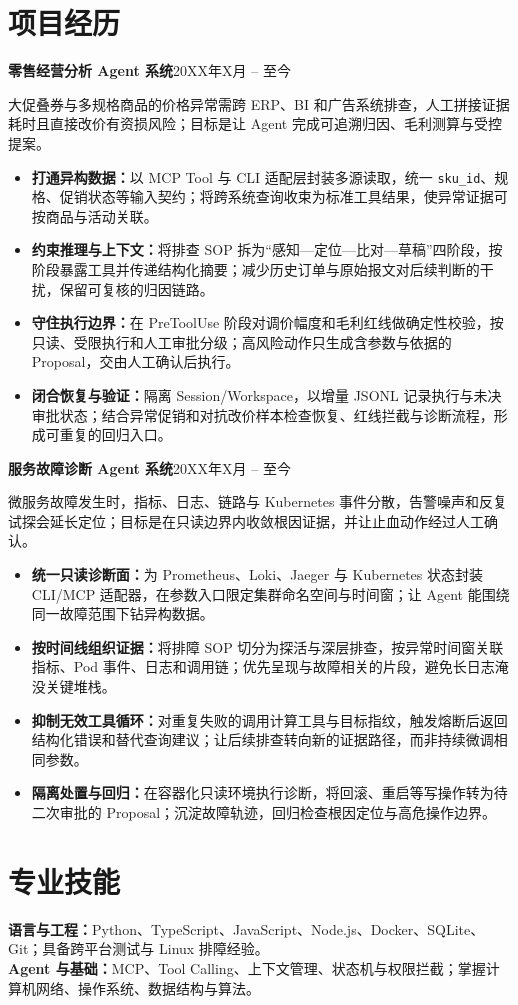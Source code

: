\documentclass[UTF8,scheme=plain,a4paper,10pt]{ctexart}
\newcommand{\datedheading}[2]{\textbf{#1}\hfill{#2}\par}
\newcommand{\projectheading}[2]{\hspace*{10pt}\datedheading{#1}{#2}}
\begin{document}
\section{项目经历}
\projectheading{零售经营分析 Agent 系统}{20XX年X月 -- 至今}
{\leftskip=10pt\noindent 大促叠券与多规格商品的价格异常需跨 ERP、BI 和广告系统排查，人工拼接证据耗时且直接改价有资损风险；目标是让 Agent 完成可追溯归因、毛利测算与受控提案。\par}
\begin{itemize}
  \item \textbf{打通异构数据：}以 MCP Tool 与 CLI 适配层封装多源读取，统一 \texttt{sku\_id}、规格、促销状态等输入契约；将跨系统查询收束为标准工具结果，使异常证据可按商品与活动关联。
  \item \textbf{约束推理与上下文：}将排查 SOP 拆为“感知—定位—比对—草稿”四阶段，按阶段暴露工具并传递结构化摘要；减少历史订单与原始报文对后续判断的干扰，保留可复核的归因链路。
  \item \textbf{守住执行边界：}在 PreToolUse 阶段对调价幅度和毛利红线做确定性校验，按只读、受限执行和人工审批分级；高风险动作只生成含参数与依据的 Proposal，交由人工确认后执行。
  \item \textbf{闭合恢复与验证：}隔离 Session/Workspace，以增量 JSONL 记录执行与未决审批状态；结合异常促销和对抗改价样本检查恢复、红线拦截与诊断流程，形成可重复的回归入口。
\end{itemize}

\projectheading{服务故障诊断 Agent 系统}{20XX年X月 -- 至今}
{\leftskip=10pt\noindent 微服务故障发生时，指标、日志、链路与 Kubernetes 事件分散，告警噪声和反复试探会延长定位；目标是在只读边界内收敛根因证据，并让止血动作经过人工确认。\par}
\begin{itemize}
  \item \textbf{统一只读诊断面：}为 Prometheus、Loki、Jaeger 与 Kubernetes 状态封装 CLI/MCP 适配器，在参数入口限定集群命名空间与时间窗；让 Agent 能围绕同一故障范围下钻异构数据。
  \item \textbf{按时间线组织证据：}将排障 SOP 切分为探活与深层排查，按异常时间窗关联指标、Pod 事件、日志和调用链；优先呈现与故障相关的片段，避免长日志淹没关键堆栈。
  \item \textbf{抑制无效工具循环：}对重复失败的调用计算工具与目标指纹，触发熔断后返回结构化错误和替代查询建议；让后续排查转向新的证据路径，而非持续微调相同参数。
  \item \textbf{隔离处置与回归：}在容器化只读环境执行诊断，将回滚、重启等写操作转为待二次审批的 Proposal；沉淀故障轨迹，回归检查根因定位与高危操作边界。
\end{itemize}

\section{专业技能}
\textbf{语言与工程：}Python、TypeScript、JavaScript、Node.js、Docker、SQLite、Git；具备跨平台测试与 Linux 排障经验。\\
\textbf{Agent 与基础：}MCP、Tool Calling、上下文管理、状态机与权限拦截；掌握计算机网络、操作系统、数据结构与算法。
\end{document}
